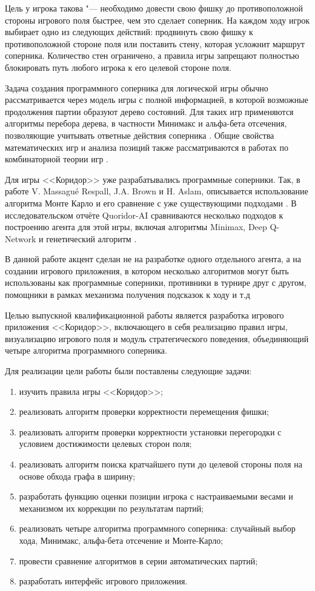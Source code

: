 \documentclass[a4paper,12pt]{diplom}
\begin{document}
Цель у игрока такова "--- необходимо довести свою фишку до противоположной стороны игрового поля быстрее, чем это сделает соперник. На каждом ходу игрок выбирает одно из следующих действий: продвинуть свою фишку к противоположной стороне поля или поставить стену, которая усложнит маршрут соперника. Количество стен ограничено, а правила игры запрещают полностью блокировать путь любого игрока к его целевой стороне поля.

Задача создания программного соперника для логической игры обычно рассматривается через модель игры с полной информацией, в которой возможные продолжения партии образуют дерево состояний. Для таких игр применяются алгоритмы перебора дерева, в частности Минимакс и альфа-бета отсечения, позволяющие учитывать ответные действия соперника \cite{Russell:2021}. Общие свойства математических игр и анализа позиций также рассматриваются в работах по комбинаторной теории игр \cite{Berlekamp:2001}.

Для игры <<Коридор>> уже разрабатывались программные соперники. Так, в работе V. Massagué Respall, J.A. Brown и H. Aslam, описывается использование алгоритма Монте Карло и его сравнение с уже существующими подходами \cite{Respall:2018}. В исследовательском отчёте Quoridor-AI сравниваются несколько подходов к построению агента для этой игры, включая алгоритмы Minimax, Deep Q-Network и генетический алгоритм \cite{Jose:2022}.

В данной работе акцент сделан не на разработке одного отдельного агента, а на создании игрового приложения, в котором несколько алгоритмов могут быть использованы как программные соперники, противники в турнире друг с другом, помощники в рамках механизма получения подсказок к ходу и т.д

Целью выпускной квалификационной работы является разработка игрового приложения <<Коридор>>, включающего в себя реализацию правил игры, визуализацию игрового поля и модуль стратегического поведения, объединяющий четыре алгоритма программного соперника.

Для реализации цели работы были поставлены следующие задачи:

\begin{enumerate}
    \item изучить правила игры <<Коридор>>;
    \item реализовать алгоритм проверки корректности перемещения фишки;
    \item реализовать алгоритм проверки корректности установки перегородки с условием достижимости целевых сторон поля;
    \item реализовать алгоритм поиска кратчайшего пути до целевой стороны поля на основе обхода графа в ширину;
    \item разработать функцию оценки позиции игрока с настраиваемыми весами и механизмом их коррекции по результатам партий;
    \item реализовать четыре алгоритма программного соперника: случайный выбор хода, Минимакс, альфа-бета отсечение и Монте-Карло;
    \item провести сравнение алгоритмов в серии автоматических партий;
    \item разработать интерфейс игрового приложения.
\end{enumerate}
\end{document}
